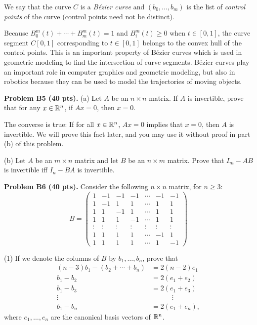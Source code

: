 \documentclass[12pt]{article}
\begin{document}
\medskip
We say that the curve $C$ is a {\it B\'ezier curve\/} and  
$(b_0, \ldots, b_m)$ is the list of
{\it control points\/} of the curve (control points need not be distinct).

\medskip

\remark
Because $B_0^m(t) + \cdots + B_m^m(t) = 1$
and $B_i^m(t) \geq 0$ when $t\in [0, 1]$, the curve segment
$C[0,1]$ corresponding to $t\in [0, 1]$ belongs to the convex
hull of the control points. This is an important property of B\'ezier curves
which is used in geometric modeling to find the intersection of curve
segments.  B\'ezier curves play an important role in
computer graphics and geometric modeling, but also in
robotics because they can be used to model the trajectories
of moving objects.

\vspace {0.25cm}\noindent
{\bf Problem B5 (40 pts).}
 (a) Let $A$ be an $n\times n$ matrix.
If $A$ is invertible, prove that for any $x\in \mathbb{R}^n$,
if $Ax = 0$,  then $x = 0$.

\medskip
The converse is true: If for all $x\in \mathbb{R}^n$,
$A x = 0 $ implies that $x = 0$, then $A$ is invertible.
We will prove this fact later, and you may use it without proof
in part (b) of this problem.

\medskip
(b)
Let $A$ be an $m\times n$ matrix and let $B$ be an $n\times m$ matrix.
Prove that $I_m - AB$ is invertible iff $I_n - BA$ is invertible.



\vspace {0.25cm}\noindent
{\bf Problem B6 (40 pts).}
Consider the following $n\times n$ matrix, 
for $n \geq 3$:
\[
B = 
\begin{pmatrix}
1 & -1 & -1   & -1 & \cdots & -1 & -1 \\
1 & -1 &   1   &  1   & \cdots  & 1  & 1 \\
1 &  1  &  -1  &  1   & \cdots  & 1 & 1\\
1 &  1  &  1  &  -1   & \cdots  & 1 & 1\\
\vdots & \vdots & \vdots & \vdots & \vdots & \vdots & \vdots\\
1 &   1  &   1 &  1 & \cdots & -1 & 1 \\ 
1 &   1  &   1 &  1 & \cdots & 1  & -1
\end{pmatrix}
\]

(1) If we denote the columns of $B$ by $b_1, \ldots, b_n$, prove that
\begin{align*}
(n - 3)b_1 - (b_2 + \cdots + b_n) & = 2(n - 2) e_1 \\
b_1 - b_2 & = 2(e_1 + e_2) \\
b_1 - b_3 & = 2(e_1 + e_3) \\
\vdots\quad &\qquad\quad \vdots \\
b_1 - b_n & = 2(e_1 + e_n) ,
\end{align*}
where $e_1, \ldots, e_n$ are the canonical basis vectors of $\mathbb{R}^n$.
\end{document}
